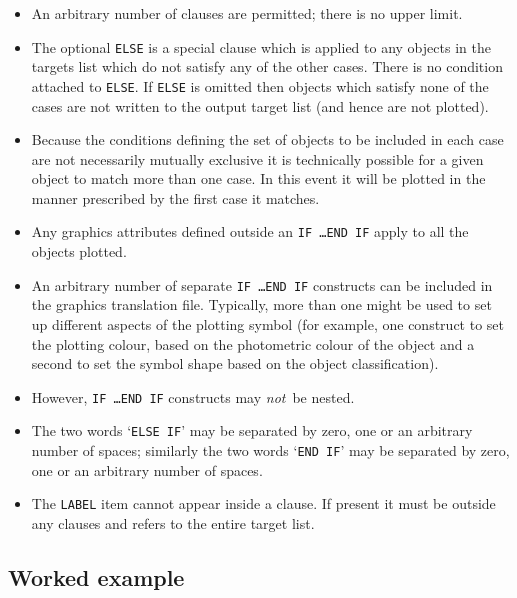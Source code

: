 \documentclass[twoside,11pt]{starlink}
\begin{document}
\begin{itemize}

  \item An arbitrary number of clauses are permitted; there is no upper
   limit.

  \item The optional \texttt{ELSE} is a special clause which is applied
   to any objects in the targets list which do not satisfy any of the
   other cases.  There is no condition attached to \texttt{ELSE}.  If
   \texttt{ELSE} is omitted then objects which satisfy none of the cases
   are not written to the output target list (and hence are not
   plotted).

  \item Because the conditions defining the set of objects to be included
   in each case are not necessarily mutually exclusive it is technically
   possible for a given object to match more than one case.  In this event
   it will be plotted in the manner prescribed by the first case it
   matches.

  \item Any graphics attributes defined outside an \texttt{IF \ldots END
   IF} apply to all the objects plotted.

  \item An arbitrary number of separate \texttt{IF \ldots END IF} constructs
   can be included in the graphics translation file.  Typically, more than
   one might be used to set up different aspects of the plotting symbol
   (for example, one construct to set the plotting colour, based on the
   photometric colour of the object and a second to set the symbol shape
   based on the object classification).

  \item However, \texttt{IF \ldots END IF} constructs may \textit{not}\, be
   nested.

  \item The two words `\texttt{ELSE IF}' may be separated by zero, one
   or an arbitrary number of spaces; similarly the two words `\texttt{END IF}'
   may be separated by zero, one or an arbitrary number of spaces.

  \item The \texttt{LABEL} item cannot appear inside a clause.  If present it
   must be outside any clauses and refers to the entire target list.

\end{itemize}

\subsection{\label{EXAMPLECHART}Worked example}
\end{document}
